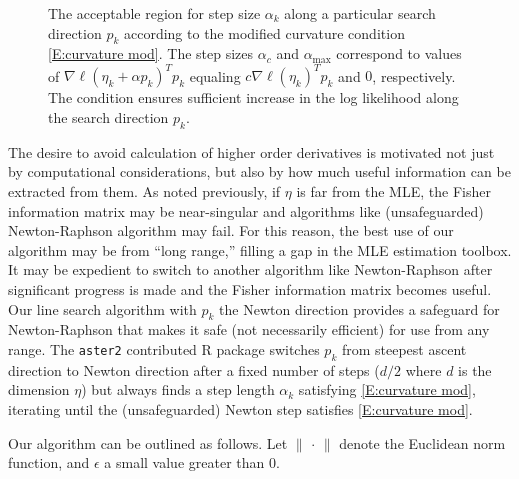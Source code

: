 \documentclass[oneside]{myumnStatThesis}
\begin{document}
\begin{figure}
\centering
    \scalebox{.4}{}
	\caption{The acceptable region for step size $\alpha_k$ along a particular search direction $p_k$ according to the 
modified curvature condition \eqref{E:curvature mod}.  The step sizes $\alpha_{c}$ and $\alpha_{\textrm{max}}$ 
correspond to values of $\nabla \ell( \eta_k + \alpha p_k)^T p_k$ equaling $c \nabla \ell(\eta_k)^T p_k$ and $0$, 
respectively.  The condition ensures sufficient increase in the log likelihood along the search direction $p_k$.}
\label{F:alpha_region}
\end{figure}
 
The desire to avoid calculation of higher order derivatives is motivated not just by computational considerations, but 
also by how much useful information can be extracted from them.   As noted previously, if $\eta$ is far from the MLE,  
the Fisher information matrix may be near-singular and algorithms like (unsafeguarded) Newton-Raphson algorithm may fail.  For this 
reason, the best use of our algorithm may be from ``long range,'' filling a gap in the MLE estimation toolbox.  It may 
be expedient to switch to another algorithm like Newton-Raphson after significant progress is made and 
the Fisher information matrix becomes useful.  Our line search algorithm with $p_k$ the Newton direction provides a
safeguard for Newton-Raphson that makes it safe (not necessarily efficient) for use from any range.
The \texttt{aster2} contributed R package \citep{aster:R} switches $p_k$ from steepest ascent direction to Newton direction
after a fixed number of steps ($d / 2$ where $d$ is the dimension $\eta$) but always finds a step length $\alpha_k$ satisfying
\eqref{E:curvature mod}, iterating until the (unsafeguarded) Newton step satisfies \eqref{E:curvature mod}.\\


\pagebreak[3]

Our algorithm can be outlined as follows.  Let $\lVert \, \cdot \, \rVert$ denote the Euclidean norm function, and $\epsilon$ 
a small value greater than 0.  \\
\end{document}
